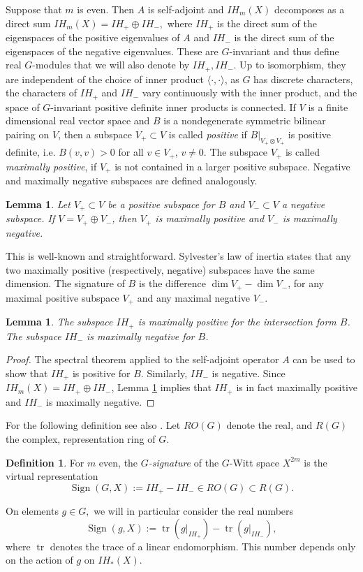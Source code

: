 \documentclass{amsart}
\newtheorem{lemma}[thm]{Lemma}
\theoremstyle{definition}
\newtheorem{defn}[thm]{Definition}
\theoremstyle{remark}
\newcommand {\Sign}    {{\ensuremath{\operatorname{Sign}}}}
\newcommand {\tr}    {{\ensuremath{\operatorname{tr}}}}
\begin{document}
Suppose that $m$ is even.
Then $A$ is self-adjoint and $IH_m (X)$ decomposes as a direct sum
$IH_m (X) = IH_+ \oplus IH_-,$ where $IH_+$ 
is the direct sum of the eigenspaces of the positive eigenvalues of $A$ and 
$IH_-$ is the direct sum of the eigenspaces of the negative eigenvalues.
These are $G$-invariant and
thus define real $G$-modules that we will also denote by
$IH_+, IH_-$. Up to isomorphism, they are independent of the choice
of inner product $\langle \cdot, \cdot \rangle$, as $G$ 
has discrete characters, the characters of $IH_+$ and $IH_-$
vary continuously with the inner product, and
the space of $G$-invariant positive definite 
inner products is connected.
If $V$ is a finite dimensional real vector space and $B$ is a 
nondegenerate symmetric bilinear pairing on $V$, 
then a subspace $V_+ \subset V$ is called
\emph{positive} if $B|_{V_+ \otimes V_+}$ is positive
definite, i.e. $B(v,v)>0$ for all $v\in V_+$,
$v\not= 0$. The subspace $V_+$ is called \emph{maximally positive},
if $V_+$ is not contained in a larger positive subspace. 
Negative and maximally negative subspaces are defined analogously.
\begin{lemma} \label{lem.decompimpmaximalpos}
Let $V_+ \subset V$ be a positive subspace for $B$ and $V_- \subset V$ 
a negative subspace.
If $V= V_+ \oplus V_-$, then $V_+$ is maximally positive and
$V_-$ is maximally negative.
\end{lemma}
This is well-known and straightforward.
Sylvester's law of inertia states that any two maximally positive (respectively, negative)
subspaces have the same dimension. The signature of $B$ is the difference
$\dim V_+ - \dim V_-$, for any maximal positive subspace $V_+$ and any
maximal negative $V_-$.
\begin{lemma} \label{lem.ihpmaxposforb}
The subspace $IH_+$ is maximally positive for the intersection form $B$.
The subspace $IH_-$ is maximally negative for $B$. 
\end{lemma}
\begin{proof}
The spectral theorem applied to the self-adjoint operator $A$
can be used to show that $IH_+$ is positive for $B$.
Similarly, $IH_-$ is negative.
Since $IH_m (X) = IH_+ \oplus IH_-$, Lemma \ref{lem.decompimpmaximalpos}
implies that $IH_+$ is in fact maximally positive and
$IH_-$ is maximally negative.
\end{proof}

For the following definition see also \cite{blp}. Let
$RO (G)$ denote the real, and $R(G)$ the complex, representation ring of $G$.
\begin{defn}
For $m$ even, the \emph{$G$-signature} of the 
$G$-Witt space $X^{2m}$ is the virtual representation
\[ \Sign (G,X) := IH_+ - IH_- \in RO(G) \subset R(G).  \]
\end{defn}
\noindent On elements $g\in G,$ we will in particular consider the real numbers
\[  \Sign (g,X) := \tr(g|_{IH_+}) - \tr(g|_{IH_-}), \]
where $\tr$ denotes the trace of a linear endomorphism.
This number depends only on the action of $g$ on $IH_* (X)$.
\end{document}
